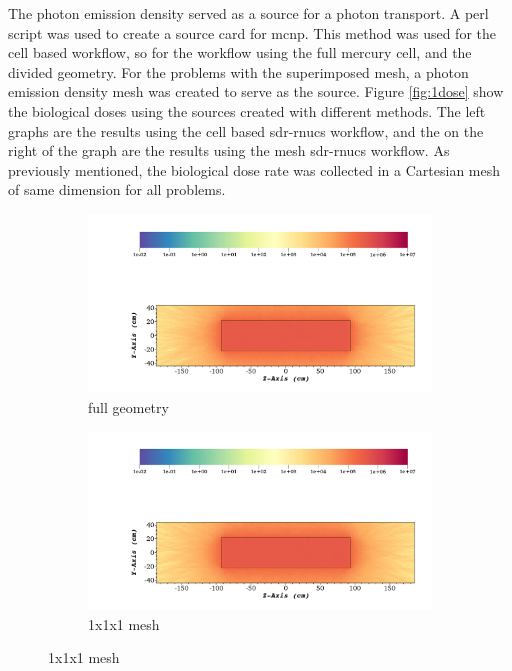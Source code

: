 %
The photon emission density served as a source for a photon transport. A perl
script was used to create a source card for \gls{mcnp}. This method was used
for the cell based workflow, so for the workflow using the full mercury cell,
and the divided geometry. For the problems with the superimposed mesh, a photon
emission density mesh was created to serve as the source.
Figure \ref{fig:1dose} show the biological doses using the sources created with
different methods. The left graphs are the results using the cell based
\gls{sdr}-rnucs workflow, and the on the right of the graph are the results
using the mesh \gls{sdr}-rnucs
workflow. As previously mentioned, the biological dose rate was collected in a
Cartesian mesh of same dimension for all problems.
\begin{figure}[H]
	\begin{subfigure}[t]{0.5\textwidth}
		\includegraphics[width=\linewidth, trim={5cm 1cm 2cm 16cm},clip]{../figs/toy_p1/dose_VPI_original.png}
		\caption{full geometry}
		\label{fig:1dose_orig}
	\end{subfigure}\hfill
	\begin{subfigure}[t]{0.5\textwidth}
		\includegraphics[width=\linewidth, trim={5cm 1cm 2cm 16cm},clip]{../figs/toy_p1/dose_VPI_1x_mesh.png}
		\caption{1x1x1 mesh}
		\label{fig:1dose_1x_mesh}
	\end{subfigure}


\end{figure}
